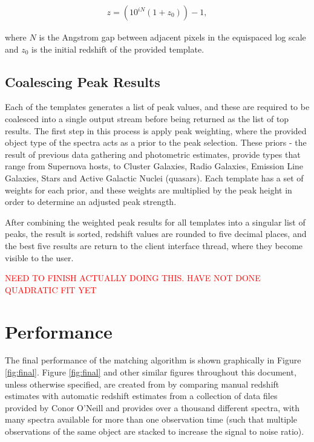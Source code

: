 \documentclass[titlesmallcaps, examinerscopy, copyrightpage]{uqthesis}
\newcommand{\brac}[1]{\left( #1 \right)}
\begin{document}
\begin{align}
z = \brac{10^{iN} (1+z_0)} - 1,
\end{align}

where $N$ is the Angstrom gap between adjacent pixels in the equispaced log scale and $z_0$ is the initial redshift of the provided template.

\subsection{Coalescing Peak Results}

Each of the templates generates a list of peak values, and these are required to be coalesced into a single output stream before being returned as the list of top results. The first step in this process is apply peak weighting, where the provided object type of the spectra acts as a prior to the peak selection. These priors - the result of previous data gathering and photometric estimates, provide types that range from Supernova hosts, to Cluster Galaxies, Radio Galaxies, Emission Line Galaxies, Stars and Active Galactic Nuclei (quasars). Each template has a set of weights for each prior, and these weights are multiplied by the peak height in order to determine an adjusted peak strength.

After combining the weighted peak results for all templates into a singular list of peaks, the result is sorted, redshift values are rounded to five decimal places, and the best five results are return to the client interface thread, where they become visible to the user.

\textcolor{red}{NEED TO FINISH ACTUALLY DOING THIS. HAVE NOT DONE QUADRATIC FIT YET}

\section{Performance} \label{sec:performance}

The final performance of the matching algorithm is shown graphically in Figure \ref{fig:final}. Figure \ref{fig:final} and other similar figures throughout this document, unless otherwise specified, are created from by comparing manual redshift estimates with automatic redshift estimates from a collection of data files provided by Conor O'Neill and provides over a thousand different spectra, with many spectra available for more than one observation time (such that multiple observations of the same object are stacked to increase the signal to noise ratio). 
\end{document}
